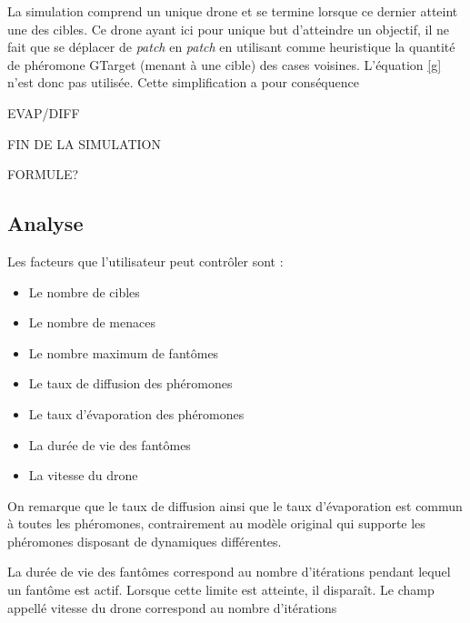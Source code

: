\documentclass[12pt]{article}
\begin{document}
La simulation comprend un unique drone et se termine lorsque ce
dernier atteint une des cibles. Ce drone ayant ici pour unique but
d'atteindre un objectif, il ne fait que se déplacer de \textit{patch}
en \textit{patch} en utilisant comme heuristique la quantité de
phéromone GTarget (menant à une cible) des cases voisines. L'équation
\ref{g} n'est donc pas utilisée. Cette simplification a pour conséquence

EVAP/DIFF

FIN DE LA SIMULATION

FORMULE?

\subsection{Analyse}

Les facteurs que l'utilisateur peut contrôler sont :

\begin{itemize}
\item{Le nombre de cibles}
\item{Le nombre de menaces}
\item{Le nombre maximum de fantômes}
\item{Le taux de diffusion des phéromones}
\item{Le taux d'évaporation des phéromones}
\item{La durée de vie des fantômes}
\item{La vitesse du drone}
\end{itemize}

On remarque que le taux de diffusion ainsi que le taux d'évaporation
est commun à toutes les phéromones, contrairement au modèle original
qui supporte les phéromones disposant de dynamiques différentes.

La durée de vie des fantômes correspond au nombre d'itérations pendant
lequel un fantôme est actif. Lorsque cette limite est atteinte, il
disparaît. Le champ appellé vitesse du drone correspond au nombre
d'itérations



\end{document}
